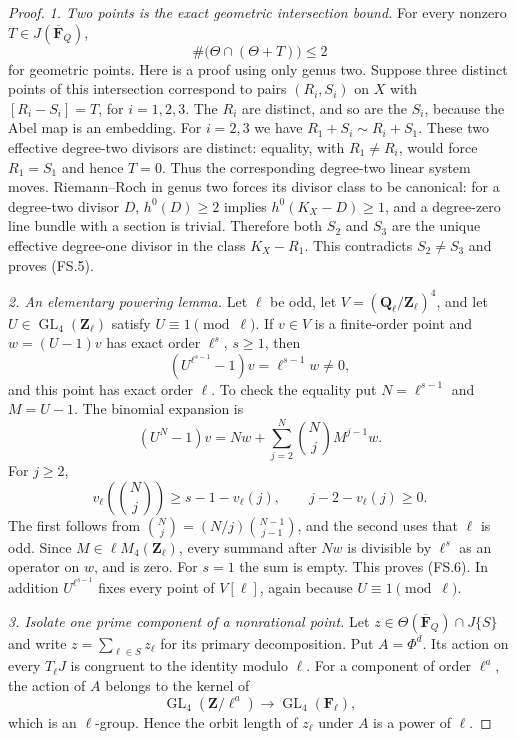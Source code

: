 \documentclass[11pt,a4paper]{article}
\begin{document}
\begin{proof}
\emph{1. Two points is the exact geometric intersection bound.}
For every nonzero $T\in J(\overline{\mathbf F}_Q)$,
\[
                  \#\bigl(\Theta\cap(\Theta+T)\bigr)\le2
                                                               \tag{FS.5}
\]
for geometric points. Here is a proof using only genus two.
Suppose three distinct points of this intersection correspond to
pairs $(R_i,S_i)$ on $X$ with
$[R_i-S_i]=T$, for $i=1,2,3$. The $R_i$ are distinct, and so
are the $S_i$, because the Abel map is an embedding.
For $i=2,3$ we have
$R_1+S_i\sim R_i+S_1$. These two effective degree-two divisors
are distinct: equality, with $R_1\ne R_i$, would force
$R_1=S_1$ and hence $T=0$.
Thus the corresponding degree-two linear system moves.
Riemann--Roch in genus two forces its divisor class to be
canonical: for a degree-two divisor $D$, $h^0(D)\ge2$ implies
$h^0(K_X-D)\ge1$, and a degree-zero line bundle with a section
is trivial. Therefore both $S_2$ and $S_3$ are the unique
effective degree-one divisor in the class $K_X-R_1$.
This contradicts $S_2\ne S_3$ and proves (FS.5).

\emph{2. An elementary powering lemma.}
Let $\ell$ be odd, let $V=(\mathbf Q_\ell/\mathbf Z_\ell)^4$,
and let $U\in\operatorname{GL}_4(\mathbf Z_\ell)$ satisfy
$U\equiv1\pmod\ell$. If $v\in V$ is a finite-order point and
$w=(U-1)v$ has exact order $\ell^s$, $s\ge1$, then
\[
        (U^{\ell^{s-1}}-1)v=\ell^{s-1}w\ne0,
                                                               \tag{FS.6}
\]
and this point has exact order $\ell$.
To check the equality put $N=\ell^{s-1}$ and $M=U-1$.
The binomial expansion is
\[
 (U^N-1)v=Nw+\sum_{j=2}^{N}\binom Nj M^{j-1}w.
\]
For $j\ge2$,
\[
 v_\ell\!\left(\binom Nj\right)\ge s-1-v_\ell(j),
 \qquad j-2-v_\ell(j)\ge0.
\]
The first follows from
$\binom Nj=(N/j)\binom{N-1}{j-1}$, and the second uses that
$\ell$ is odd. Since $M\in\ell M_4(\mathbf Z_\ell)$, every
summand after $Nw$ is divisible by $\ell^s$ as an operator on
$w$, and is zero. For $s=1$ the sum is empty. This proves
(FS.6). In addition $U^{\ell^{s-1}}$ fixes every point of
$V[\ell]$, again because $U\equiv1\pmod\ell$.

\emph{3. Isolate one prime component of a nonrational point.}
Let $z\in\Theta(\overline{\mathbf F}_Q)\cap J\{S\}$ and
write $z=\sum_{\ell\in S}z_\ell$ for its primary decomposition.
Put $A=\Phi^d$. Its action on every $T_\ell J$ is congruent
to the identity modulo $\ell$. For a component of order
$\ell^a$, the action of $A$ belongs to the kernel of
\[
 \operatorname{GL}_4(\mathbf Z/\ell^a)
                         \longrightarrow\operatorname{GL}_4(\mathbf F_\ell),
\]
which is an $\ell$-group. Hence the orbit length of $z_\ell$
under $A$ is a power of $\ell$.


\end{proof}
\end{document}

